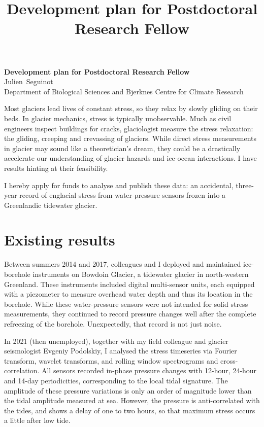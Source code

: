 \documentclass{article}
\title{Development plan for Postdoctoral Research Fellow}
\begin{document}
\setlength{\parskip}{0.5\baselineskip}

    \begin{center}
      \textbf{Development plan for Postdoctoral Research Fellow}\\
      Julien~Seguinot \\
      Department of Biological Sciences and
      Bjerknes Centre for Climate Research
    \end{center}

    Most glaciers lead lives of constant stress, so they relax by slowly
    gliding on their beds. In glacier mechanics, stress is typically
    unobservable. Much as civil engineers inspect buildings for cracks,
    glaciologist measure the stress relaxation: the gliding, creeping and
    crevassing of glaciers. While direct stress measurements in glacier may
    sound like a theoretician's dream, they could be a drastically accelerate
    our understanding of glacier hazards and ice-ocean interactions. I have
    results hinting at their feasibility.

    I hereby apply for funds to analyse and publish these data: an accidental,
    three-year record of englacial stress from water-pressure sensors frozen
    into a Greenlandic tidewater glacier.

\section{Existing results}

    Between summers 2014 and 2017, colleagues and I deployed and maintained
    ice-borehole instruments on Bowdoin Glacier, a tidewater glacier in
    north-western Greenland. These instruments included digital multi-sensor
    units, each equipped with a piezometer to measure overhead water depth and
    thus its location in the borehole. While these water-pressure sensors were
    not intended for solid stress measurements, they continued to record
    pressure changes well after the complete refreezing of the borehole.
    Unexpectedly, that record is not just noise.

    In 2021 (then unemployed), together with my field colleague and glacier
    seismologist Evgeniy Podolskiy, I analysed the stress timeseries via
    Fourier transform, wavelet transforms, and rolling window spectrograms and
    cross-correlation.
    All sensors recorded in-phase pressure changes with 12-hour, 24-hour and
    14-day periodicities, corresponding to the local tidal signature.
    The amplitude of these pressure variations is only an order of magnitude
    lower than the tidal amplitude measured at sea. However, the pressure is
    anti-correlated with the tides, and shows a delay of one to two hours, so
    that maximum stress occurs a little after low tide.
\end{document}

